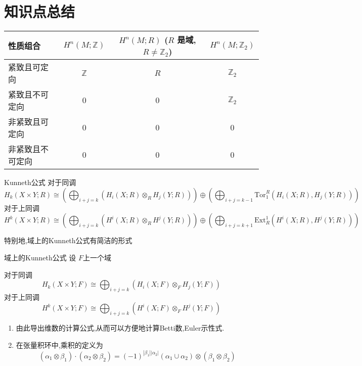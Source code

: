 \documentclass[../../几何与拓扑.tex]{subfiles}
\begin{document}
 
\ifSubfilesClassLoaded{
    \frontmatter

    \tableofcontents
    
    \mainmatter
}{}

\chapter{知识点总结}
\begin{tabular}{|l | c | c | c|}
\hline
性质组合             & $H^n(M; \mathbb{Z})$ & $H^n(M; R)$ (\(  R  \)  是域, $R \neq \mathbb{Z}_2$) & $H^n(M; \mathbb{Z}_2)$ \\
\hline
紧致且可定向         & $\mathbb{Z}$         & $R$                                       & $\mathbb{Z}_2$         \\
\hline
紧致且不可定向       & $0$                  & $0$                                       & $\mathbb{Z}_2$         \\
\hline
非紧致且可定向       & $0$                  & $0$                                       & $0$                    \\
\hline
非紧致且不可定向     & $0$                  & $0$                                       & $0$                    \\
\hline
\end{tabular}
\begin{theorem}{Kunneth公式}
    对于同调
   $$
H_k(X \times Y; R) \cong \left( \bigoplus_{i+j=k} (H_i(X; R) \otimes_R H_j(Y; R)) \right) \oplus \left( \bigoplus_{i+j=k-1} \text{Tor}_1^R(H_i(X; R), H_j(Y; R)) \right)
$$
对于上同调
$$
H^k(X \times Y; R) \cong \left( \bigoplus_{i+j=k} (H^i(X; R) \otimes_R H^j(Y; R)) \right) \oplus \left( \bigoplus_{i+j=k+1} \text{Ext}_R^1(H^i(X; R), H^j(Y; R)) \right)
$$
\end{theorem}

特别地,域上的Kunneth公式有简洁的形式

\begin{theorem}{域上的Kunneth公式}
  设 \(  F  \)上一个域
  
  对于同调$$
H_k(X \times Y; F) \cong \bigoplus_{i+j=k} (H_i(X; F) \otimes_F H_j(Y; F))
$$对于上同调$$
H^k(X \times Y; F) \cong \bigoplus_{i+j=k} (H^i(X; F) \otimes_F H^j(Y; F))
$$
\end{theorem}
\begin{remark}
   \begin{enumerate}
    \item  由此导出维数的计算公式,从而可以方便地计算Betti数,Euler示性式.
    \item 在张量积环中,乘积的定义为 \[
    \left( \alpha _1 \otimes \beta _1  \right)\cdot \left( \alpha _2 \otimes \beta _2  \right) =  \left( -1 \right)^{\left| \beta _1  \right|\left| \alpha _2  \right|  }\left( \alpha _1 \cup \alpha _2  \right)\otimes \left( \beta _1 \otimes \beta _2  \right)     
    \]
   \end{enumerate}
   
\end{remark}
\end{document}
